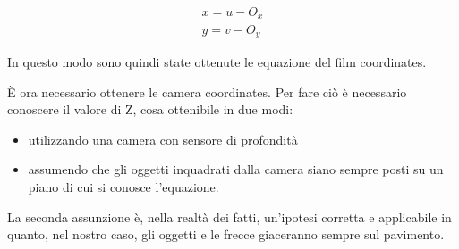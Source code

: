 \begin{equation}
\begin{split}
x = u -O_{x}\\
y = v -O_{y}
\end{split}
\end{equation}

In questo modo sono quindi state ottenute le equazione del film coordinates. 

È ora necessario ottenere le camera coordinates. Per fare ciò è necessario conoscere il valore di Z, cosa ottenibile in due modi:
\begin{itemize}
	\item utilizzando una camera con sensore di profondità
	\item assumendo che gli oggetti inquadrati dalla camera siano sempre posti su un piano di cui si conosce l'equazione.
\end{itemize}
La seconda assunzione è, nella realtà dei fatti, un'ipotesi corretta e applicabile in quanto, nel nostro caso, gli oggetti e le frecce giaceranno sempre sul pavimento.

